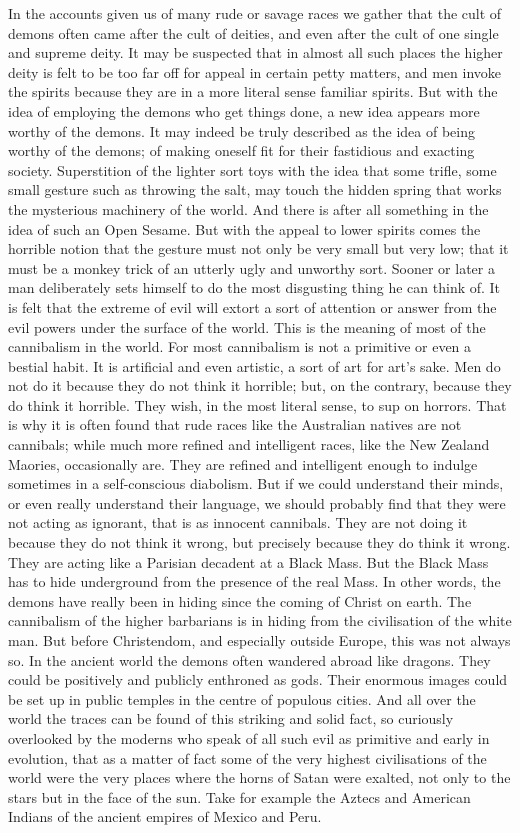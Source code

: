 In the accounts given us of many rude or savage races we gather that the cult of demons often came after the cult of deities, and even after the cult of one single and supreme deity. It may be suspected that in almost all such places the higher deity is felt to be too far off for appeal in certain petty matters, and men invoke the spirits because they are in a more literal sense familiar spirits. But with the idea of employing the demons who get things done, a new idea appears more worthy of the demons. It may indeed be truly described as the idea of being worthy of the demons; of making oneself fit for their fastidious and exacting society. Superstition of the lighter sort toys with the idea that some trifle, some small gesture such as throwing the salt, may touch the hidden spring that works the mysterious machinery of the world. And there is after all something in the idea of such an Open Sesame. But with the appeal to lower spirits comes the horrible notion that the gesture must not only be very small but very low; that it must be a monkey trick of an utterly ugly and unworthy sort. Sooner or later a man deliberately sets himself to do the most disgusting thing he can think of. It is felt that the extreme of evil will extort a sort of attention or answer from the evil powers under the surface of the world. This is the meaning of most of the cannibalism in the world. For most cannibalism is not a primitive or even a bestial habit. It is artificial and even artistic, a sort of art for art's sake. Men do not do it because they do not think it horrible; but, on the contrary, because they do think it horrible. They wish, in the most literal sense, to sup on horrors. That is why it is often found that rude races like the Australian natives are not cannibals; while much more refined and intelligent races, like the New Zealand Maories, occasionally are. They are refined and intelligent enough to indulge sometimes in a self-conscious diabolism. But if we could understand their minds, or even really understand their language, we should probably find that they were not acting as ignorant, that is as innocent cannibals. They are not doing it because they do not think it wrong, but precisely because they do think it wrong. They are acting like a Parisian decadent at a Black Mass. But the Black Mass has to hide underground from the presence of the real Mass. In other words, the demons have really been in hiding since the coming of Christ on earth. The cannibalism of the higher barbarians is in hiding from the civilisation of the white man. But before Christendom, and especially outside Europe, this was not always so. In the ancient world the demons often wandered abroad like dragons. They could be positively and publicly enthroned as gods. Their enormous images could be set up in public temples in the centre of populous cities. And all over the world the traces can be found of this striking and solid fact, so curiously overlooked by the moderns who speak of all such evil as primitive and early in evolution, that as a matter of fact some of the very highest civilisations of the world were the very places where the horns of Satan were exalted, not only to the stars but in the face of the sun. Take for example the Aztecs and American Indians of the ancient empires of Mexico and Peru. 